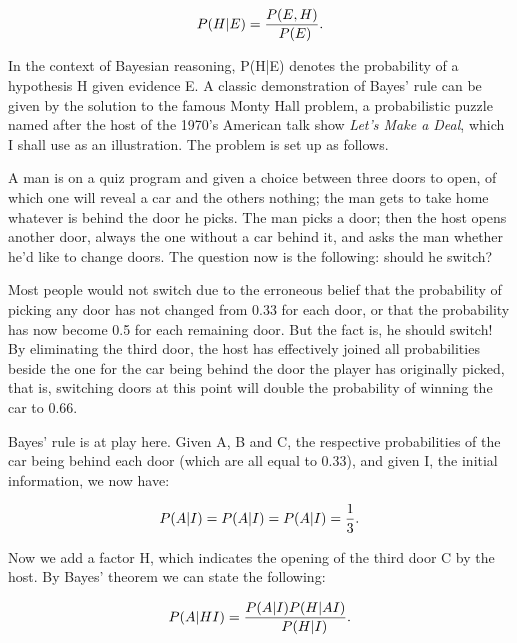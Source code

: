 \begin{equation}
 \\P(H|E)=\frac{\\P(E,H)}{\\P(E)}.
\end{equation}

In the context of Bayesian reasoning, P(H|E) denotes the probability of a
hypothesis H given evidence E. A classic demonstration of Bayes' rule can be
given by the solution to the famous Monty Hall problem, a probabilistic puzzle
named after the host of the 1970's American talk show \textit{Let's Make a
Deal}, which I shall use as an illustration. The problem is set up as follows.

A man is on a quiz program and given a choice between three doors to open, of
which one will reveal a car and the others nothing; the man gets to take home
whatever is behind the door he picks. The man picks a door; then the host opens
another door, always the one without a car behind it, and asks the man whether
he'd like to change doors. The question now is the following: should he switch?

Most people would not switch due to the erroneous belief that the probability
of picking any door has not changed from 0.33 for each door, or that the
probability has now become 0.5 for each remaining door. But the fact is, he
should switch! By eliminating the third door, the host has effectively joined
all probabilities beside the one for the car being behind the door the player
has originally picked, that is, switching doors at this point will double the
probability of winning the car to 0.66.

Bayes' rule is at play here. Given A, B and C, the respective probabilities of
the car being behind each door (which are all equal to 0.33), and given I, the
initial information, we now have:

\begin{equation}
 \\P(A|I) = \\P(A|I) = \\P(A|I) = \frac{1}{3}.
\end{equation}

Now we add a factor H, which indicates the opening of the third door C by the
host. By Bayes' theorem we can state the following:

\begin{equation}
  \\P(A|HI) = \frac{\\P(A|I) \\P(H|AI)}{\\P(H|I)}.
\end{equation}

